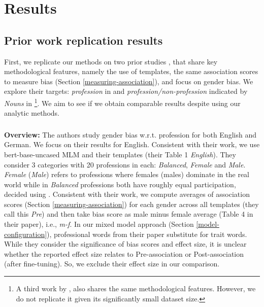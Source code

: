 \section{Results}

\subsection{Prior work replication results}\label{prior-work-replication}

\noindent First, we replicate our methods on two prior studies \cite{bartl-etal-2020-unmasking,limisiewicz-marecek-2022-dont}, 
that share key methodological features, namely the use of templates, the same association scores to measure bias (Section \ref{measuring-association}), and focus on gender bias. 
%
We explore their targets:  \textit{profession} in \citet{bartl-etal-2020-unmasking} and \textit{profession/non-profession} indicated by \textit{Nouns} in \citet{limisiewicz-marecek-2022-dont}\footnote{A third work by \citet{kurita-etal-2019-measuring}, 
also shares the same methodological features.
However, we do not replicate it given its significantly small dataset size.}.
%
We aim to see if we obtain comparable results despite using our analytic methods. 

\subsubsection{\texorpdfstring{\citet{bartl-etal-2020-unmasking}}{}}

\noindent \textbf{Overview:} The authors study gender bias w.r.t. profession for both English and German. 
%
We focus on their results for English.
%
Consistent with their work, we use bert-base-uncased MLM and their templates (their Table 1 \textit{English}).  
%
They consider 3 categories with 20 professions in each: \textit{Balanced}, \textit{Female} and \textit{Male}. 
%
\textit{Female} (\textit{Male}) refers to professions where females (males) dominate in the real world while in \textit{Balanced} professions both have roughly equal participation, decided using \citet{us2020employed}.
%
Consistent with their work, we compute averages of association scores (Section \ref{measuring-association}) for each gender across all templates (they call this \textit{Pre}) and then take bias score as male minus female average (Table 4 in their paper), i.e., \textit{m-f}.
%
In our mixed model approach (Section \ref{model-configuration}), professional words from their paper substitute for trait words.
%
While they consider 
the significance of bias scores and effect size, it is unclear whether the reported effect size relates to Pre-association or Post-association (after fine-tuning). So, we exclude their effect size in our comparison.


